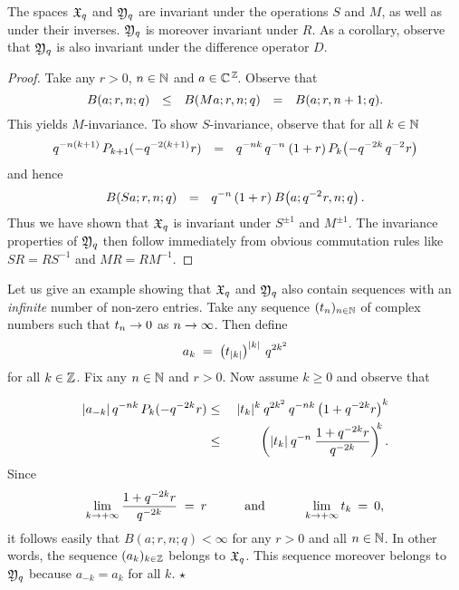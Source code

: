 \begin{lemma}  \label{lemma:morefunc:sequences:invariance}
The spaces\/ $\seqX$ and\/ $\seqY$ are invariant under the operations\/ $S$ and\/ $M$,
as well as under their inverses. $\seqY$ is moreover invariant under\/ $R$.
As a corollary, observe that\/ $\seqY$ is also invariant under the
difference operator\/ $D$.
\end{lemma}
\begin{proof}
Take any $r>0$, $n\in \NN$ and $a\in \CZ$. Observe that
$$   B(a; r, n; q)
\hspace {0.7em} \leq \hspace {0.7em}
     B(M a; r, n; q)
\hspace {0.7em} = \hspace {0.7em}
     B(a; r, n+1; q). $$
This yields $M$-invariance. To show $S$-invariance, observe that for all $k\in\NN$
$$  q^{-n(k+1)}\, P_{k+1}(-q^{-2(k+1)} \vssp r)
              \hspace {0.7em}=\hspace {0.7em}
    q^{-nk}\, q^{-n}  \: (1+r)\, P_k \!\left(-q^{-2k} \, q^{-2} \vssp r \vertM\right) $$
and hence
$$    B(Sa; r, n; q)
\hspace {0.7em}=\hspace {0.7em}
      q^{-n} \, (1+r)  \:  B \!\left(a; q^{-2} \vssp r, n; q\vertM\right).   $$
Thus we have shown that $\seqX$ is invariant under $S^{\pm 1}$ and $M ^{\pm 1}$.
The invariance properties of $\seqY$ then follow immediately from obvious
commutation rules like $SR=RS^{-1}$ and $MR=RM^{-1}$.
\end{proof}



\begin{ex} \rm
Let us give an example showing that $\seqX$ and $\seqY$ also contain sequences with
an {\em infinite\/} number of non-zero entries.
Take any sequence $(t_n)_{n\in \NN}$ of complex numbers such that $t_n \rarr 0$
as $n\rarr \infty$. Then define
$$ a_k  \;=\; \left(t_{|k|}\vertM\right)^{|k|}\: q^{2 k^2} $$
for all $k\in \ZZ$.
Fix any $n\in \NN$ and $r>0$. Now assume $k \geq 0$ and observe that
\begin{eqnarray*}
      |a_{-k}| \, q^{-nk}\, P_k(-q^{-2k} \vssp r)
&\leq\vertXL&
      |t_k|^k \: q^{2 k^2} \: q^{-nk}  \left(1 + q^{-2k} r \vertM\right)^k
\\&\leq\vertXXL&
      \left(|t_k| \:  q^{-n} \: \frac{1 + q^{-2k} r}{q^{-2k}}  \right)^{\!\! k}.
\end{eqnarray*}
Since
$$  \lim_{k \rarr +\infty} \frac{1 + q^{-2k} r}{q^{-2k}} \;=\: r
                \andspace{3em}
    \lim_{k \rarr +\infty} t_k \:=\: 0, $$
it follows easily that $B(a; r, n; q) < \infty$ for any $r>0$ and all $n\in \NN$.
In other words, the sequence $(a_k)_{k\in\ZZ}$ belongs to $\seqX$.
This sequence moreover belongs to $\seqY$ because $a_{-k} = a_{k}$ for all $k$.
\hfill $\star$
\end{ex}




